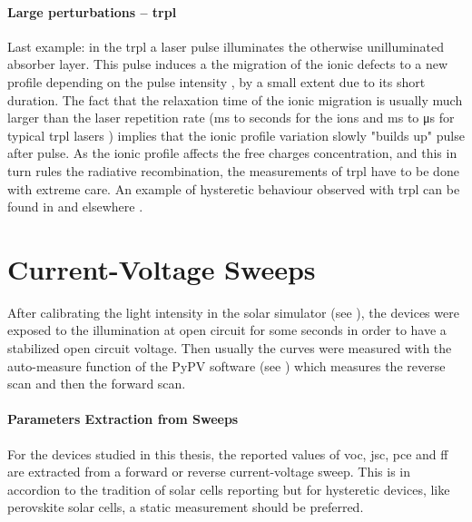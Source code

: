 		\paragraph{Large perturbations -- \gls{trpl}} Last example: in the \glsdesc{trpl} a laser pulse illuminates the otherwise unilluminated absorber layer. This pulse induces a the migration of the ionic defects to a new profile depending on the pulse intensity \cite{Levine2018}, by a small extent due to its short duration. The fact that the relaxation time of the ionic migration is usually much larger than the laser repetition rate (\si{\ms} to seconds for the ions \cite{Jacobs2018} and \si{\ms} to \si{\us} for typical \gls{trpl} lasers \cite{EdinburghInstruments}) implies that the ionic profile variation slowly "builds up" pulse after pulse. As the ionic profile affects the free charges concentration, and this in turn rules the radiative recombination, the measurements of \gls{trpl} have to be done with extreme care. An example of hysteretic behaviour observed with \gls{trpl} can be found in  and elsewhere \cite{Chen2015,Chen2017}.

\section{Current-Voltage Sweeps}

	After calibrating the light intensity in the solar simulator (see ), the devices were exposed to the illumination at open circuit for some seconds in order to have a stabilized open circuit voltage. Then usually the curves were measured with the auto-measure function of the PyPV software (see ) which measures the reverse scan and then the forward scan.

	\paragraph{Parameters Extraction from Sweeps}
	For the devices studied in this thesis, the reported values of \gls{voc}, \gls{jsc}, \gls{pce} and \gls{ff} are extracted from a forward or reverse current-voltage sweep. This is in accordion to the tradition of solar cells reporting but for hysteretic devices, like perovskite solar cells, a static measurement should be preferred. %

